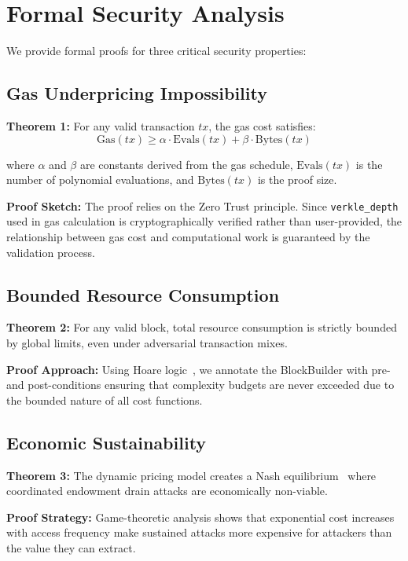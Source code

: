 \documentclass{article}
\begin{document}
\section{Formal Security Analysis}

We provide formal proofs for three critical security properties:

\subsection{Gas Underpricing Impossibility}

\textbf{Theorem 1:} For any valid transaction $tx$, the gas cost satisfies:
$$\text{Gas}(tx) \geq \alpha \cdot \text{Evals}(tx) + \beta \cdot \text{Bytes}(tx)$$

where $\alpha$ and $\beta$ are constants derived from the gas schedule, $\text{Evals}(tx)$ is the number of polynomial evaluations, and $\text{Bytes}(tx)$ is the proof size.

\textbf{Proof Sketch:} The proof relies on the Zero Trust principle. Since \texttt{verkle\_depth} used in gas calculation is cryptographically verified rather than user-provided, the relationship between gas cost and computational work is guaranteed by the validation process.

\subsection{Bounded Resource Consumption}

\textbf{Theorem 2:} For any valid block, total resource consumption is strictly bounded by global limits, even under adversarial transaction mixes.

\textbf{Proof Approach:} Using Hoare logic~\cite{paulson1998inductive}, we annotate the BlockBuilder with pre- and post-conditions ensuring that complexity budgets are never exceeded due to the bounded nature of all cost functions.

\subsection{Economic Sustainability}

\textbf{Theorem 3:} The dynamic pricing model creates a Nash equilibrium~\cite{reynouard2024bar} where coordinated endowment drain attacks are economically non-viable.

\textbf{Proof Strategy:} Game-theoretic analysis shows that exponential cost increases with access frequency make sustained attacks more expensive for attackers than the value they can extract.
\end{document}
